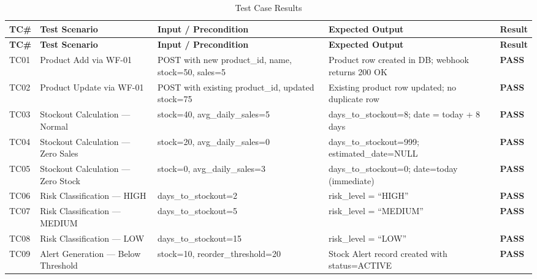 {\singlespacing
\renewcommand{\arraystretch}{1.5}
\begin{longtable}{@{} p{1.2cm} >{\raggedright\arraybackslash}p{3.5cm} >{\raggedright\arraybackslash}p{4.2cm} >{\raggedright\arraybackslash}p{4.5cm} p{1.5cm} @{}}
\caption{Test Case Results}
\label{tab:testcases} \\
\toprule
\textbf{TC\#} & \textbf{Test Scenario} & \textbf{Input / Precondition} &
\textbf{Expected Output} & \textbf{Result} \\
\midrule
\endfirsthead
\toprule
\textbf{TC\#} & \textbf{Test Scenario} & \textbf{Input / Precondition} &
\textbf{Expected Output} & \textbf{Result} \\
\midrule
\endhead
\bottomrule
\endfoot

TC01 & Product Add via WF-01 &
  POST with new product\_id, name, stock=50, sales=5 &
  Product row created in DB; webhook returns 200 OK &
  \textbf{PASS} \\

TC02 & Product Update via WF-01 &
  POST with existing product\_id, updated stock=75 &
  Existing product row updated; no duplicate row &
  \textbf{PASS} \\

TC03 & Stockout Calculation — Normal &
  stock=40, avg\_daily\_sales=5 &
  days\_to\_stockout=8; date = today + 8 days &
  \textbf{PASS} \\

TC04 & Stockout Calculation — Zero Sales &
  stock=20, avg\_daily\_sales=0 &
  days\_to\_stockout=999; estimated\_date=NULL &
  \textbf{PASS} \\

TC05 & Stockout Calculation — Zero Stock &
  stock=0, avg\_daily\_sales=3 &
  days\_to\_stockout=0; date=today (immediate) &
  \textbf{PASS} \\

TC06 & Risk Classification — HIGH &
  days\_to\_stockout=2 &
  risk\_level = ``HIGH'' &
  \textbf{PASS} \\

TC07 & Risk Classification — MEDIUM &
  days\_to\_stockout=5 &
  risk\_level = ``MEDIUM'' &
  \textbf{PASS} \\

TC08 & Risk Classification — LOW &
  days\_to\_stockout=15 &
  risk\_level = ``LOW'' &
  \textbf{PASS} \\

TC09 & Alert Generation — Below Threshold &
  stock=10, reorder\_threshold=20 &
  Stock Alert record created with status=ACTIVE &
  \textbf{PASS} \\


\end{longtable}}
